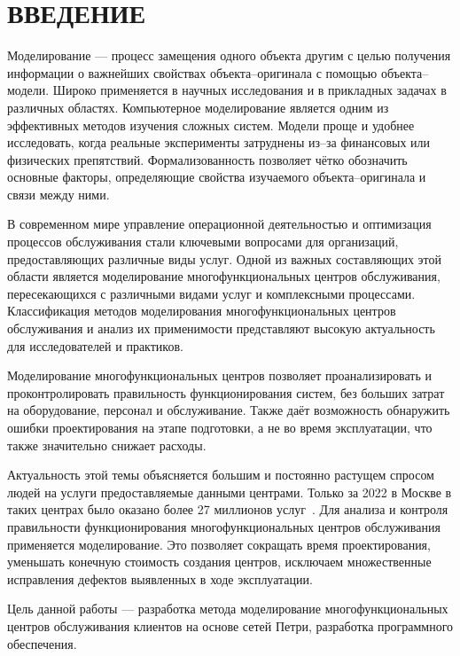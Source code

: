 \chapter*{ВВЕДЕНИЕ}

Моделирование --- процесс замещения одного объекта другим с целью получения информации о важнейших свойствах объекта--оригинала с помощью объекта--модели. Широко применяется в научных исследования и в прикладных задачах в различных областях. Компьютерное моделирование является одним из эффективных методов изучения сложных систем. Модели проще и удобнее исследовать, когда реальные эксперименты затруднены из--за финансовых или физических препятствий. Формализованность позволяет чётко обозначить основные факторы, определяющие свойства изучаемого объекта--оригинала и связи между ними.

В современном мире управление операционной деятельностью и оптимизация процессов обслуживания стали ключевыми вопросами для организаций, предоставляющих различные виды услуг. Одной из важных составляющих этой области является моделирование многофункциональных центров обслуживания, пересекающихся с различными видами услуг и комплексными процессами. Классификация методов моделирования многофункциональных центров обслуживания и анализ их применимости представляют высокую актуальность для исследователей и практиков.

Моделирование многофункциональных центров позволяет проанализировать и проконтролировать правильность функционирования систем, без больших затрат на оборудование, персонал и обслуживание. Также даёт возможность обнаружить ошибки проектирования на этапе подготовки, а не во время эксплуатации, что также значительно снижает расходы.

Актуальность этой темы объясняется большим и постоянно растущем спросом людей на услуги предоставляемые данными центрами. Только за 2022 в Москве в таких центрах было оказано более 27 миллионов услуг~\cite{actual}. Для анализа и контроля правильности функционирования многофункциональных центров обслуживания применяется моделирование. Это позволяет сокращать время проектирования, уменьшать конечную стоимость создания центров, исключаем множественные исправления дефектов выявленных в ходе эксплуатации.

Цель данной работы --- разработка метода моделирование многофункциональных центров обслуживания клиентов на основе сетей Петри, разработка программного обеспечения.

